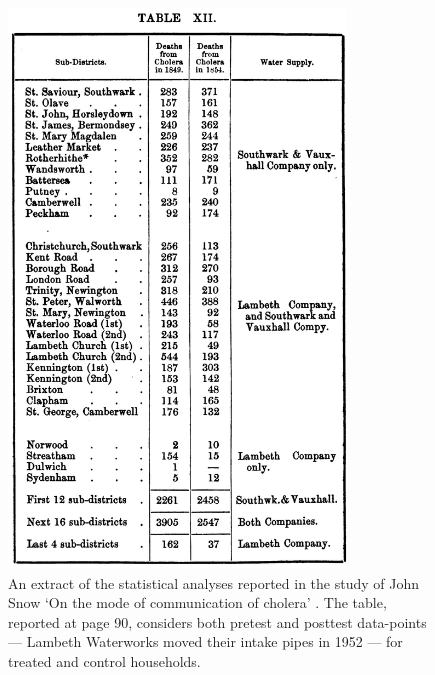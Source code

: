 \begin{refsection}
\begin{figure}
  \begin{small}
    \begin{center}
      \includegraphics[width=0.8\textwidth]{exhibits/snow_natural_experiment.png}
    \end{center}
    \caption{An extract of the statistical analyses reported in the study of John 
    Snow `On the mode of communication of cholera' \parencite*{snow_1855}. The 
    table, reported at page 90, considers both pretest and posttest data-points ---
    Lambeth Waterworks moved their intake pipes in 1952 --- for treated 
    and control households.}
    \label{fig:snow_natural_experiment}
  \end{small}
\end{figure}


\end{refsection}
